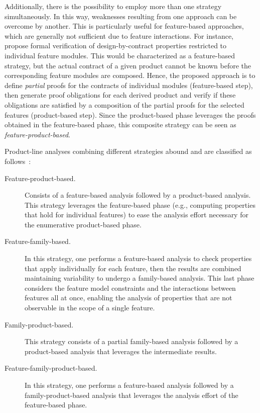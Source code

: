 Additionally, there is the possibility to employ more than one strategy simultaneously.
In this way, weaknesses resulting from one approach can be overcome by another. This is particularly useful for feature-based
approaches, which are generally not sufficient due to feature interactions.
For instance, \citet{ThumProofComposition} propose formal verification of
design-by-contract properties \cite{MeyerDbC} restricted to individual feature modules.
This would be characterized as a feature-based strategy, but the actual
contract of a given product cannot be known before the corresponding
feature modules are composed.
Hence, the proposed approach is to define \emph{partial} proofs for the
contracts of individual modules (feature-based step), then generate proof
obligations for each derived product and verify if these obligations are
satisfied by a composition of the partial proofs for the selected
features (product-based step).
Since the product-based phase leverages the proofs obtained in the
feature-based phase, this composite strategy can be seen as
\emph{feature-product-based}.

Product-line analyses combining different  strategies abound and are classified as
follows~\cite{Thum2014,PLAModel}:


\begin{description}
    \item[Feature-product-based.]
        Consists of a feature-based analysis followed by a product-based
        analysis.
        This strategy leverages the feature-based phase (e.g., computing properties 
        that hold for individual features) to ease the
        analysis effort necessary for the enumerative product-based phase.
    \item[Feature-family-based.]
        In this strategy, one performs a feature-based analysis to check
        properties that apply individually for each feature, then the
        results are combined maintaining variability to undergo a family-based analysis.
        This last phase considers the feature model constraints and the
        interactions between features all at once, enabling the analysis of
        properties that are not observable in the scope of a single feature.
    \item[Family-product-based.]
        This strategy consists of a partial family-based analysis followed
        by a product-based analysis that leverages the intermediate
        results.
    \item[Feature-family-product-based.]
        In this strategy, one performs a feature-based analysis followed by a
        family-product-based analysis that leverages the analysis effort of
        the feature-based phase.
\end{description}


